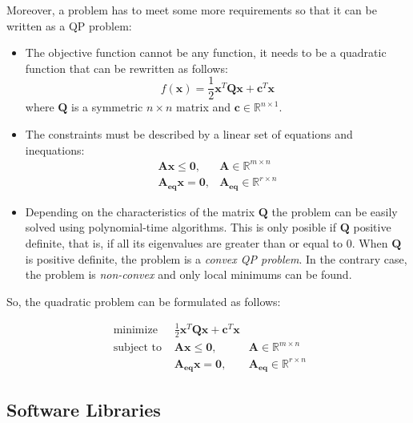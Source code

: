 Moreover, a problem has to meet some more requirements so that it can be written as a QP problem:

\begin{itemize}
    \item The objective function cannot be any function, it needs to be a quadratic function that can be rewritten as follows:
    $$
    f(\mathbf{x}) = \frac{1}{2} \mathbf{x}^{T} \mathbf{Q} \mathbf{x}+\mathbf{c}^{T} \mathbf{x}
    $$
    where $\mathbf{Q}$ is a symmetric $n \times n$ matrix and $\mathbf{c} \in \mathbb{R}^{n \times 1}$.
    \item The constraints must be described by a linear set of equations and inequations:
    $$
    \begin{array}{ll}
        \mathbf{A} \mathbf{x} \leq \mathbf{0}, & \mathbf{A} \in \mathbb{R}^{m \times n} \\
        \mathbf{A_{eq}} \mathbf{x} = \mathbf{0}, & \mathbf{A_{eq}} \in \mathbb{R}^{r \times n}
    \end{array}
    $$
    \item Depending on the characteristics of the matrix $\mathbf{Q}$ the problem can be easily solved using polynomial-time algorithms. This is only posible if $\mathbf{Q}$ positive definite, that is, if all its eigenvalues are greater than or equal to $0$. When $\mathbf{Q}$ is positive definite, the problem is a \textit{convex QP problem}. In the contrary case, the problem is \textit{non-convex} and only local minimums can be found.
\end{itemize}

So, the quadratic problem can be formulated as follows:


\begin{equation}
    \label{eq:QP}
    \begin{array}{lll}
        \text { minimize } & \frac{1}{2} \mathbf{x}^{T} \mathbf{Q} \mathbf{x}+\mathbf{c}^{T} \mathbf{x} &\\
        \text { subject to } & \mathbf{A} \mathbf{x} \leq \mathbf{0}, & \mathbf{A} \in \mathbb{R}^{m \times n} \\
        & \mathbf{A_{eq}} \mathbf{x} = \mathbf{0}, & \mathbf{A_{eq}} \in \mathbb{R}^{r \times n}
    \end{array}
\end{equation}

\subsection{Software Libraries}

